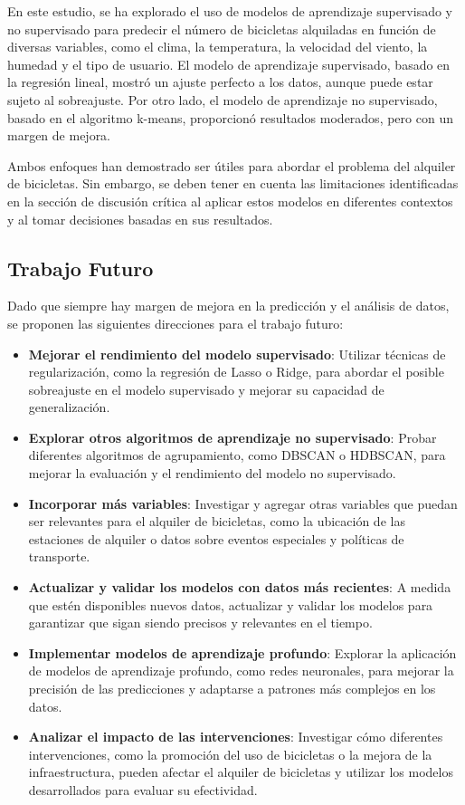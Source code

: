 \documentclass{wsdcr}
\begin{document}
En este estudio, se ha explorado el uso de modelos de aprendizaje supervisado y no supervisado para predecir el número de bicicletas alquiladas en función de diversas variables, como el clima, la temperatura, la velocidad del viento, la humedad y el tipo de usuario. El modelo de aprendizaje supervisado, basado en la regresión lineal, mostró un ajuste perfecto a los datos, aunque puede estar sujeto al sobreajuste. Por otro lado, el modelo de aprendizaje no supervisado, basado en el algoritmo k-means, proporcionó resultados moderados, pero con un margen de mejora.

Ambos enfoques han demostrado ser útiles para abordar el problema del alquiler de bicicletas. Sin embargo, se deben tener en cuenta las limitaciones identificadas en la sección de discusión crítica al aplicar estos modelos en diferentes contextos y al tomar decisiones basadas en sus resultados.

\subsection{Trabajo Futuro}

Dado que siempre hay margen de mejora en la predicción y el análisis de datos, se proponen las siguientes direcciones para el trabajo futuro:

\begin{itemize}
    \item \textbf{Mejorar el rendimiento del modelo supervisado}: Utilizar técnicas de regularización, como la regresión de Lasso o Ridge, para abordar el posible sobreajuste en el modelo supervisado y mejorar su capacidad de generalización.
    \item \textbf{Explorar otros algoritmos de aprendizaje no supervisado}: Probar diferentes algoritmos de agrupamiento, como DBSCAN o HDBSCAN, para mejorar la evaluación y el rendimiento del modelo no supervisado.
    \item \textbf{Incorporar más variables}: Investigar y agregar otras variables que puedan ser relevantes para el alquiler de bicicletas, como la ubicación de las estaciones de alquiler o datos sobre eventos especiales y políticas de transporte.
    \item \textbf{Actualizar y validar los modelos con datos más recientes}: A medida que estén disponibles nuevos datos, actualizar y validar los modelos para garantizar que sigan siendo precisos y relevantes en el tiempo.
    \item \textbf{Implementar modelos de aprendizaje profundo}: Explorar la aplicación de modelos de aprendizaje profundo, como redes neuronales, para mejorar la precisión de las predicciones y adaptarse a patrones más complejos en los datos.
    \item \textbf{Analizar el impacto de las intervenciones}: Investigar cómo diferentes intervenciones, como la promoción del uso de bicicletas o la mejora de la infraestructura, pueden afectar el alquiler de bicicletas y utilizar los modelos desarrollados para evaluar su efectividad.

\end{itemize}
\end{document}
